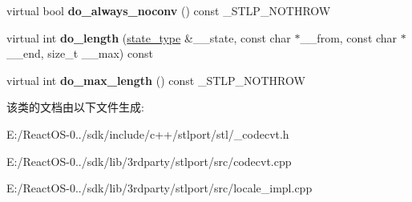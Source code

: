 \begin{DoxyCompactItemize}
virtual bool {\bfseries do\+\_\+always\+\_\+noconv} () const \+\_\+\+S\+T\+L\+P\+\_\+\+N\+O\+T\+H\+R\+OW
\item 
\mbox{\label{classcodecvt_3_01wchar__t_00_01char_00_01mbstate__t_01_4_a7046c9e9f4c11ca497187df9d6c776d6}} 
virtual int {\bfseries do\+\_\+length} (\hyperlink{struct____mbstate__t}{state\+\_\+type} \&\+\_\+\+\_\+state, const char $\ast$\+\_\+\+\_\+from, const char $\ast$\+\_\+\+\_\+end, size\+\_\+t \+\_\+\+\_\+max) const
\item 
\mbox{\label{classcodecvt_3_01wchar__t_00_01char_00_01mbstate__t_01_4_a2fb5a5c2df6c3664d04a2ffd7e56eb22}} 
virtual int {\bfseries do\+\_\+max\+\_\+length} () const \+\_\+\+S\+T\+L\+P\+\_\+\+N\+O\+T\+H\+R\+OW
\end{DoxyCompactItemize}


该类的文档由以下文件生成\+:\begin{DoxyCompactItemize}
\item 
E\+:/\+React\+O\+S-\/0../sdk/include/c++/stlport/stl/\+\_\+codecvt.\+h\item 
E\+:/\+React\+O\+S-\/0../sdk/lib/3rdparty/stlport/src/codecvt.\+cpp\item 
E\+:/\+React\+O\+S-\/0../sdk/lib/3rdparty/stlport/src/locale\+\_\+impl.\+cpp\end{DoxyCompactItemize}
